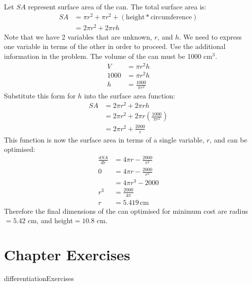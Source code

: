 Let $SA$ represent surface area of the can. The total surface area is:
\begin{align*}
SA&=\pi r^2 + \pi r^2 + \left(\textrm{height}*\textrm{circumference}\right)\\
&=2\pi r^2+2\pi rh
\end{align*}
Note that we have 2 variables that are unknown, $r$, and $h$. We need to express one variable in terms of the other in order to proceed. Use the additional information in the problem. The volume of the can must be 1000 cm$^3$.
\begin{align*}
V&=\pi r^2 h\\
1000&=\pi r^2 h\\
h&=\frac{1000}{\pi r^2}
\end{align*}
Substitute this form for $h$ into the surface area function:
\begin{align*}
SA&=2\pi r^2+2\pi rh\\
&=2\pi r^2+2\pi r\left(\frac{1000}{\pi r^2} \right)\\
&=2\pi r^2+\frac{2000}{r}
\end{align*}
This function is now the surface area in terms of a single variable, $r$, and can be optimised:
\begin{align*}
\frac{dSA}{dr}&=4\pi r-\frac{2000}{r^2}\\
0&=4\pi r-\frac{2000}{r^2}\\
&=4\pi r^3-2000\\
r^3&=\frac{2000}{4\pi}\\
r&=5.419 \,\textrm{cm}
\end{align*}
Therefore the final dimensions of the can optimised for minimum cost are radius$=5.42$ cm, and height$=10.8$ cm. 
 \section{Chapter Exercises}
 {differentiationExercises}
